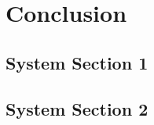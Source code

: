 %
\chapter{Conclusion}
\label{sec:conclusion}



\section{System Section 1}
\label{sec:conclusion:sec1}



\section{System Section 2}
\label{sec:conclusion:sec2}




